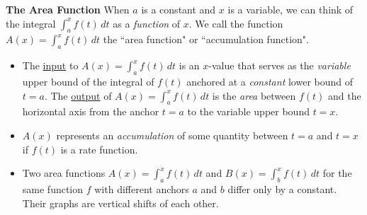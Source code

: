 \documentclass{article}
\begin{document}
\begin{framed}
    \textbf{The Area Function}
When $a$ is a constant and $x$ is a variable, we can think of the integral $\displaystyle \int_a^x f(t)\,dt$ as a \textit{function} of $x$. We call the function $A(x) = \displaystyle \int_a^x
  f(t)\,dt$ the ``area function" or ``accumulation function".
   \begin{center}
    \hspace{0.25in}
     
  \end{center}
    \begin{itemize}
        \item The \underline{input} to $A(x) = \displaystyle \int_a^x
  f(t)\,dt$ is an $x$-value that serves as the \textit{variable} upper bound of the integral of $f(t)$ anchored at a \textit{constant} lower bound of $t=a$. The \underline{output} of $A(x) = \displaystyle \int_a^x
  f(t)\,dt$ is the \textit{area} 
  between $f(t)$ and the horizontal axis from the anchor $t=a$ to the variable upper bound $t=x$. \newline
  \vfill
  \item $A(x)$ represents an \textit{accumulation} of some quantity between $t=a$ and $t=x$ if $f(t)$ is a rate function.\newline
  \vfill
  \item Two area functions $A(x) = \displaystyle \int_a^x
  f(t)\,dt$ and $B(x) = \displaystyle \int_b^x
  f(t)\,dt$ for the
same function $f$ with different anchors $a$ and $b$ differ only by a constant. Their graphs are vertical shifts of each other.
  \end{itemize}
  \end{framed}
\end{document}
